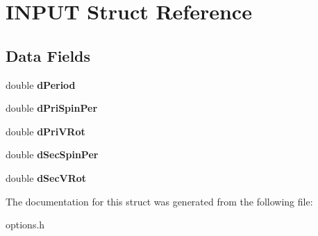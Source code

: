 \hypertarget{struct_i_n_p_u_t}{}\section{I\+N\+P\+U\+T Struct Reference}
\label{struct_i_n_p_u_t}
\subsection*{Data Fields}
\begin{DoxyCompactItemize}
\item 
\hypertarget{struct_i_n_p_u_t_a8bb6a214670120a9cb555f4342636be4}{}double {\bfseries d\+Period}\label{struct_i_n_p_u_t_a8bb6a214670120a9cb555f4342636be4}

\item 
\hypertarget{struct_i_n_p_u_t_a5f202a8c3d90a82c2f131ce1a91adeaa}{}double {\bfseries d\+Pri\+Spin\+Per}\label{struct_i_n_p_u_t_a5f202a8c3d90a82c2f131ce1a91adeaa}

\item 
\hypertarget{struct_i_n_p_u_t_ac0dc4d92dab9713971751eaa4008b4de}{}double {\bfseries d\+Pri\+V\+Rot}\label{struct_i_n_p_u_t_ac0dc4d92dab9713971751eaa4008b4de}

\item 
\hypertarget{struct_i_n_p_u_t_a1b1a44a78c7545dae6c5530422681fea}{}double {\bfseries d\+Sec\+Spin\+Per}\label{struct_i_n_p_u_t_a1b1a44a78c7545dae6c5530422681fea}

\item 
\hypertarget{struct_i_n_p_u_t_ab8ce34976c3eaf4295252e48b200d409}{}double {\bfseries d\+Sec\+V\+Rot}\label{struct_i_n_p_u_t_ab8ce34976c3eaf4295252e48b200d409}

\end{DoxyCompactItemize}


The documentation for this struct was generated from the following file\+:\begin{DoxyCompactItemize}
\item 
options.\+h\end{DoxyCompactItemize}
